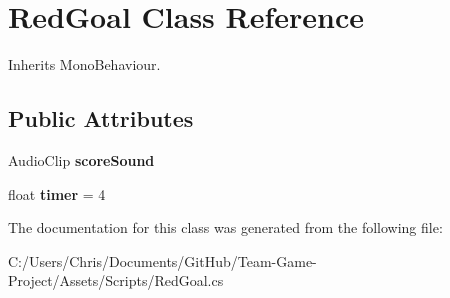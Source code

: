 \hypertarget{class_red_goal}{}\section{Red\+Goal Class Reference}
\label{class_red_goal}


Inherits Mono\+Behaviour.

\subsection*{Public Attributes}
\begin{DoxyCompactItemize}
\item 
Audio\+Clip {\bfseries score\+Sound}\hypertarget{class_red_goal_a860fb8e244ff5662f6972f291186df53}{}\label{class_red_goal_a860fb8e244ff5662f6972f291186df53}

\item 
float {\bfseries timer} = 4\hypertarget{class_red_goal_a480c87e7dead9c29cd82de7d155290a2}{}\label{class_red_goal_a480c87e7dead9c29cd82de7d155290a2}

\end{DoxyCompactItemize}


The documentation for this class was generated from the following file\+:\begin{DoxyCompactItemize}
\item 
C\+:/\+Users/\+Chris/\+Documents/\+Git\+Hub/\+Team-\/\+Game-\/\+Project/\+Assets/\+Scripts/Red\+Goal.\+cs\end{DoxyCompactItemize}
